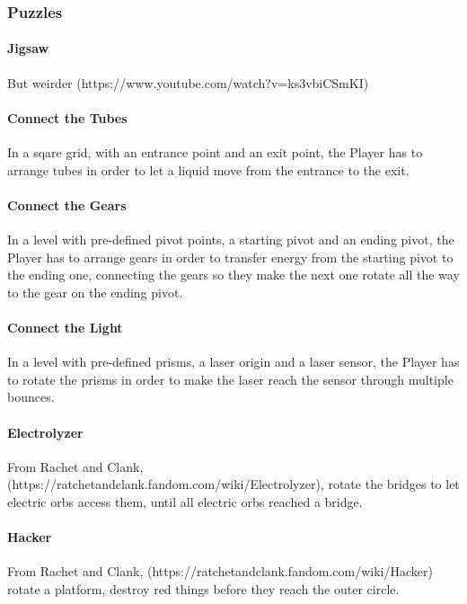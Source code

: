 \subsubsection{Puzzles}

\paragraph{Jigsaw} But weirder (https://www.youtube.com/watch?v=ks3vbiCSmKI)

\paragraph{Connect the Tubes} In a sqare grid, with an entrance point and an exit point, the Player has to arrange tubes in order to let a liquid move from the entrance to the exit.

\paragraph{Connect the Gears} In a level with pre-defined pivot points, a starting pivot and an ending pivot, the Player has to arrange gears in order to transfer energy from the starting pivot to the ending one, connecting the gears so they make the next one rotate all the way to the gear on the ending pivot.

\paragraph{Connect the Light} In a level with pre-defined prisms, a laser origin and a laser sensor, the Player has to rotate the prisms in order to make the laser reach the sensor through multiple bounces.

\paragraph{Electrolyzer} From Rachet and Clank, (https://ratchetandclank.fandom.com/wiki/Electrolyzer), rotate the bridges to let electric orbs access them, until all electric orbs reached a bridge.


\paragraph{Hacker} From Rachet and Clank, (https://ratchetandclank.fandom.com/wiki/Hacker) rotate a platform, destroy red things before they reach the outer circle.

